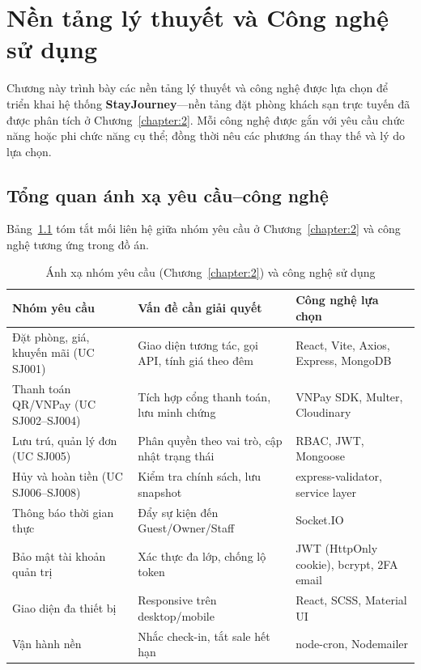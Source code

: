 \documentclass[../DoAn.tex]{subfiles}
\begin{document}
\chapter{Nền tảng lý thuyết và Công nghệ sử dụng}
\label{chapter:3}

Chương này trình bày các nền tảng lý thuyết và công nghệ được lựa chọn để triển khai hệ thống \textbf{StayJourney}---nền tảng đặt phòng khách sạn trực tuyến đã được phân tích ở Chương~\ref{chapter:2}. Mỗi công nghệ được gắn với yêu cầu chức năng hoặc phi chức năng cụ thể; đồng thời nêu các phương án thay thế và lý do lựa chọn.

\section{Tổng quan ánh xạ yêu cầu--công nghệ}
\label{section:3.1}

Bảng~\ref{tab:yeu-cau-cong-nghe} tóm tắt mối liên hệ giữa nhóm yêu cầu ở Chương~\ref{chapter:2} và công nghệ tương ứng trong đồ án.

\begin{table}[htbp]
\centering
\caption{Ánh xạ nhóm yêu cầu (Chương~\ref{chapter:2}) và công nghệ sử dụng}
\label{tab:yeu-cau-cong-nghe}
\small
\begin{tabular}{|p{4.2cm}|p{5.8cm}|p{4.5cm}|}
\hline
\textbf{Nhóm yêu cầu} & \textbf{Vấn đề cần giải quyết} & \textbf{Công nghệ lựa chọn} \\
\hline
Đặt phòng, giá, khuyến mãi (UC SJ001) & Giao diện tương tác, gọi API, tính giá theo đêm & React, Vite, Axios, Express, MongoDB \\
\hline
Thanh toán QR/VNPay (UC SJ002--SJ004) & Tích hợp cổng thanh toán, lưu minh chứng & VNPay SDK, Multer, Cloudinary \\
\hline
Lưu trú, quản lý đơn (UC SJ005) & Phân quyền theo vai trò, cập nhật trạng thái & RBAC, JWT, Mongoose \\
\hline
Hủy và hoàn tiền (UC SJ006--SJ008) & Kiểm tra chính sách, lưu snapshot & express-validator, service layer \\
\hline
Thông báo thời gian thực & Đẩy sự kiện đến Guest/Owner/Staff & Socket.IO \\
\hline
Bảo mật tài khoản quản trị & Xác thực đa lớp, chống lộ token & JWT (HttpOnly cookie), bcrypt, 2FA email \\
\hline
Giao diện đa thiết bị & Responsive trên desktop/mobile & React, SCSS, Material UI \\
\hline
Vận hành nền & Nhắc check-in, tắt sale hết hạn & node-cron, Nodemailer \\
\hline
\end{tabular}
\end{table}
\end{document}
